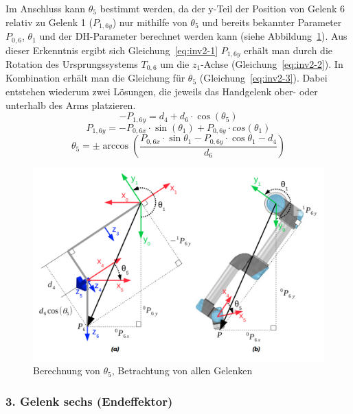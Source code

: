 Im Anschluss kann $\theta_5$ bestimmt werden, da der y-Teil der Position von Gelenk 6 relativ zu Gelenk 1 ($P_{1,6y}$) nur mithilfe von $\theta_5$ und bereits bekannter Parameter $P_{0,6}$, $\theta_1$ und der DH-Parameter berechnet werden kann (siehe Abbildung~\ref{fig:inv1-2}).
Aus dieser Erkenntnis ergibt sich Gleichung~\ref{eq:inv2-1}
$P_{1,6y}$ erhält man durch die Rotation des Ursprungssystems $T_{0,6}$ um die $z_1$-Achse (Gleichung~\ref{eq:inv2-2}).
In Kombination erhält man die Gleichung für $\theta_5$ (Gleichung~\ref{eq:inv2-3}).
Dabei entstehen wiederum zwei Lösungen, die jeweils das Handgelenk ober- oder unterhalb des Arms platzieren.
\begin{equation}
    - P_{1,6y} = d_4 + d_6 \cdot \cos(\theta_5)
    \label{eq:inv2-1}
\end{equation}
\begin{equation}
    P_{1,6y} = - P_{0,6x} \cdot \sin(\theta_1) + P_{0,6y} \cdot cos(\theta_1)
    \label{eq:inv2-2}
\end{equation}
\begin{equation}
    \theta_5 = \pm \arccos \left( \frac{ P_{0,6x} \cdot \sin\theta_1 - P_{0,6y} \cdot \cos\theta_1 - d_4 }{ d_6 } \right)
    \label{eq:inv2-3}
\end{equation}
\begin{figure}[h]
    \centering
    \includegraphics[width = .5\textwidth]{Bilder/inv2}
    \caption{Berechnung von $\theta_5$, Betrachtung von allen Gelenken~\cite{rasmusandersenKinematicsUR52018}}\label{fig:inv1-2}
\end{figure}

\subsubsection{3. Gelenk sechs (Endeffektor)}


